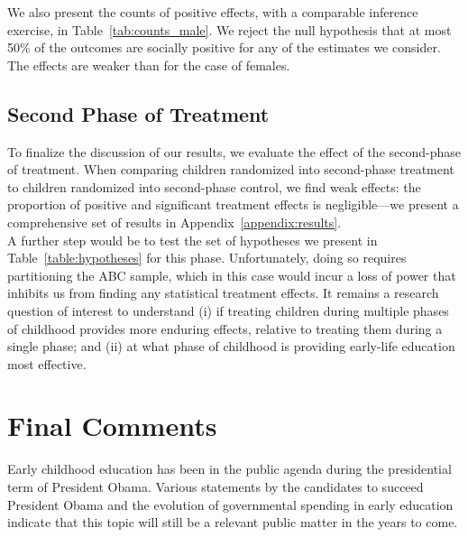 \noindent We also present the counts of positive effects, with a comparable inference exercise, in Table~\ref{tab:counts_male}. We reject the null hypothesis that at most 50\% of the outcomes are socially positive for any of the estimates we consider. The effects are weaker than for the case of females.\\





\subsection{Second Phase of Treatment} \label{section:second}

\noindent To finalize the discussion of our results, we evaluate the effect of the second-phase of treatment. When comparing children randomized into second-phase treatment to children randomized into second-phase control, we find weak effects: the proportion of positive and significant treatment effects is negligible---we present a comprehensive set of results in Appendix~\ref{appendix:results}.\\

\noindent A further step would be to test the set of hypotheses we present in Table~\ref{table:hypotheses} for this phase. Unfortunately, doing so requires partitioning the ABC sample, which in this case would incur a loss of power that inhibits us from finding any statistical treatment effects. It remains a research question of interest to understand (i) if treating children during multiple phases of childhood provides more enduring effects, relative to treating them during a single phase; and (ii) at what phase of childhood is providing early-life education most effective.

\section{Final Comments} \label{section:conclusion}

\noindent Early childhood education has been in the public agenda during the presidential term of President Obama. Various statements by the candidates to succeed President Obama and the evolution of governmental spending in early education indicate that this topic will still be a relevant public matter in the years to come.\\ 

